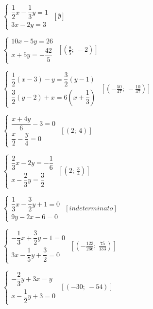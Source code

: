 \begin{esercizio}[\Ast]
\begin{multicols}{2}
\begin{enumeratea}
{%
\item \(\left\{\begin{array}{l}
{\dfrac{1}{2}x-\dfrac{1}{3}y=1}\\
{3x-2y=3}\end{array}\right.\)
 \hfill \(\left[\emptyset\right]\)
\item \(\left\{\begin{array}{l}
{10x-5y=26}\\
{x+5y=-\dfrac{42}{5}}\end{array}\right.\)
 \hfill \(\left[\left(\frac{8}{5};~-2\right)\right]\)
\item \(\left\{\begin{array}{l}
\dfrac{1}{2}(x-3)-y=\dfrac{3}{2}(y-1)\\
\dfrac{3}{2}(y-2)+x=6\left(x+\dfrac{1}{3}\right)\end{array}\right.\)
 \hfill \(\left[(-\frac{50}{47};~-\frac{10}{47})\right]\)
\item \(\left\{\begin{array}{l}
\dfrac{x+4y}{6}-3=0\\
\dfrac{x}{2}-\dfrac{y}{4}=0\end{array}\right.\)
 \hfill \(\left[(2;~4)\right]\)}
{\longarray
\item 
\(\left\{\begin{array}{l}\dfrac{2}{3}x-2y=-{\dfrac{1}{6}}\\x-\dfrac{2}{3}
y=\dfrac{3}{2} \end{array}\right.\)
 \hfill \(\left[\left(2;~\frac{3}{4}\right)\right]\)
\item \(\left\{\begin{array}{l}\dfrac{1}{3}x-\dfrac{3}{2}y+1=0\\9y-2x-6=0 
\end{array}\right.\)
 \hfill \(\left[indeterminato\right]\)
\item 
\(\left\{\begin{array}{l}-{\dfrac{1}{3}}x+\dfrac{3}{2}y-1=0\\3x-\dfrac{1}{5}
y+\dfrac{3}{2}=0 \end{array}\right.\)
 \hfill \(\left[(-{\frac{123}{266}};~\frac{75}{133})\right]\)
\item \(\left\{\begin{array}{l}-{\dfrac{2}{3}}y+3x=y\\x-\dfrac{1}{2}y+3=0 
\end{array}\right.\)
 \hfill \(\left[(-30;~-54)\right]\)}
\end{enumeratea}
\end{multicols}
\end{esercizio}

